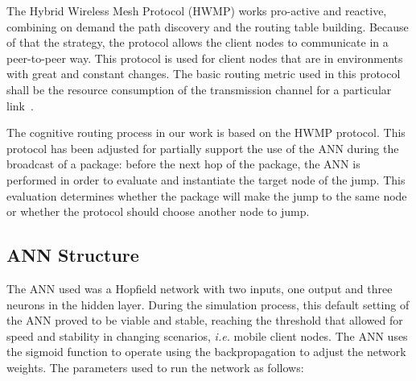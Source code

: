 \documentclass[10pt, conference, compsocconf]{IEEEtran}
\begin{document}

The Hybrid Wireless Mesh Protocol (HWMP) works pro-active and reactive, combining on demand the path discovery and the routing table building. Because of that the strategy, the protocol allows the client nodes to communicate in a peer-to-peer way. This protocol is used for client nodes that are in environments with great and constant changes. The basic routing metric used in this protocol shall be the resource consumption of the transmission channel for a particular link~\cite{IEEE:8011:2s}.


The cognitive routing process in our work is based on the HWMP protocol. This protocol has been adjusted for partially support the use of the ANN during the broadcast of a package: before the next hop of the package, the ANN is performed in order to evaluate and instantiate the target node of the jump. This evaluation determines whether the package will make the jump to the same node or whether the protocol should choose another node to jump.

\subsection {ANN Structure}

The ANN used was a Hopfield network with two inputs, one output and three neurons in the hidden layer. During the simulation process, this default setting of the ANN proved to be viable and stable, reaching the threshold that allowed for speed and stability in changing scenarios, \textit{i.e.} mobile client nodes. The ANN uses the sigmoid function to operate using the backpropagation to adjust the network weights. The parameters used to run the network as follows:
\end{document}
